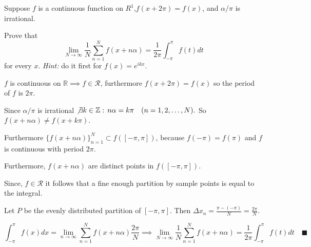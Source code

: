 \documentclass{article}
\newcommand\Z{\mathbb{Z}}
\newcommand\R{\mathbb{R}}
\begin{document}
Suppose $f$ is a continuous function on $R^1$,$f(x+2\pi) = f(x)$, and
$\alpha/\pi$ is irrational.

Prove that
\[\lim_{N\rightarrow \infty} \frac{1}{N}\sum_{n=1}^N f(x+n\alpha)
  =\frac{1}{2\pi}\int_{-\pi}^\pi f(t) dt\]
for every $x$. \textit{Hint:}  do it first for $f(x) = e^{ikx}$.


$f$ is continuous on $\R \implies f \in \mathcal{R}$, furthermore $f(x+2\pi) = f(x)$ so the period of $f$ is $2\pi$.

Since $\alpha/\pi$ is irrational $\not\exists k\in \Z:\, n\alpha  =
k\pi\quad (n = 1,2,\dots, N).$ So $f(x+n\alpha) \neq f(x+k\pi)$.

Furthermore $\{f(x+n\alpha)\}_{n=1}^N \subset f([-\pi,\pi])$, because
$f(-\pi)= f(\pi)$ and $f$ is continuous with period $2\pi$.

Furthermore, $f(x+n\alpha)$
are distinct points in  $f([-\pi,\pi])$.

Since, $f \in \mathcal{R}$ it
follows that a fine enough partition by sample points is equal to the
integral.

Let $P$ be the evenly
distributed partition of $[-\pi,\pi]$. Then $\varDelta x_n =
\frac{\pi-(-\pi)}{N} = \frac{2\pi}{N}$.

\[\int_{-\pi}^\pi f(x) dx = \lim_{n\rightarrow \infty} \sum_{n=1}^N
  f(x +n\alpha)\frac{2\pi}{N} \implies \lim_{N\rightarrow \infty} \frac{1}{N}\sum_{n=1}^N f(x+n\alpha)
  =\frac{1}{2\pi}\int_{-\pi}^\pi f(t) dt\quad \blacksquare\]
\end{document}
